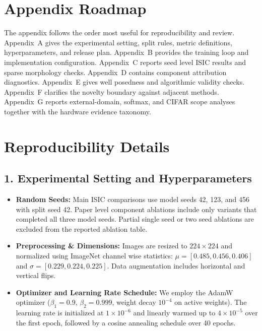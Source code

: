 \documentclass[letterpaper]{article}
\begin{document}
\section*{Appendix Roadmap}
The appendix follows the order most useful for reproducibility and review.
Appendix~A gives the experimental setting, split rules, metric definitions,
hyperparameters, and release plan. Appendix~B provides the training loop and implementation
configuration. Appendix~C reports seed level ISIC results and sparse morphology
checks. Appendix~D contains component attribution diagnostics. Appendix~E gives
well posedness and algorithmic validity checks. Appendix~F clarifies the novelty
boundary against adjacent methods. Appendix~G reports external-domain,
softmax, and CIFAR scope analyses together with the hardware evidence taxonomy.

\section{Reproducibility Details}
\label{app:reproducibility}

\subsection*{1. Experimental Setting and Hyperparameters}
\begin{itemize}
    \item \textbf{Random Seeds:} Main ISIC comparisons use model seeds 42, 123, and 456 with split seed 42. Paper level component ablations include only variants that completed all three model seeds. Partial single seed or two seed ablations are excluded from the reported ablation table.
    \item \textbf{Preprocessing \& Dimensions:} Images are resized to $224 \times 224$ and normalized using ImageNet channel wise statistics: $\mu = [0.485, 0.456, 0.406]$ and $\sigma = [0.229, 0.224, 0.225]$. Data augmentation includes horizontal and vertical flips.
    \item \textbf{Optimizer and Learning Rate Schedule:} We employ the AdamW optimizer ($\beta_1=0.9$, $\beta_2=0.999$, weight decay $10^{-4}$ on active weights). The learning rate is initialized at $1\times10^{-6}$ and linearly warmed up to $4\times10^{-5}$ over the first epoch, followed by a cosine annealing schedule \cite{loshchilov2016sgdr} over 40 epochs.
\end{itemize}
\end{document}
